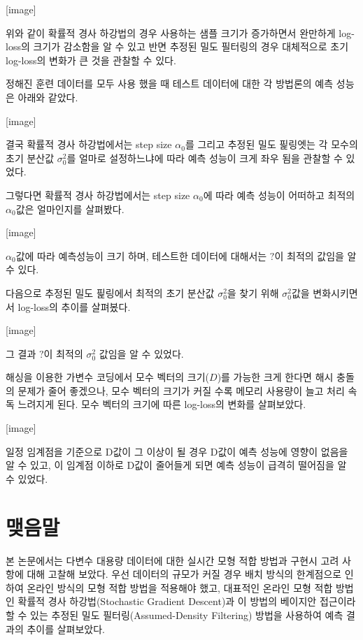 \documentclass[oneside,b5paper,11pt]{book} %
\begin{document}
[image]

위와 같이 확률적 경사 하강법의 경우 사용하는 샘플 크기가 증가하면서 완만하게 log-loss의 크기가 감소함을 알 수 있고 반면 추정된 밀도 필터링의 경우 대체적으로 초기 log-loss의 변화가 큰 것을 관찰할 수 있다. 

 정해진 훈련 데이터를 모두 사용 했을 때 테스트 데이터에 대한 각 방법론의 예측 성능은 아래와 같았다.

[image]

결국 확률적 경사 하강법에서는 step size $\alpha_0$를 그리고 추정된 밀도 핉링엣는 각 모수의 초기 분산값 $\sigma_0^2$를 얼마로 설정하느냐에 따라 예측 성능이 크게 좌우 됨을 관찰할 수 있었다.

 그렇다면 확률적 경사 하강법에서는 step size $\alpha_0$에 따라 예측 성능이 어떠하고 최적의 $\alpha_0$값은 얼마인지를 살펴봤다.

[image]

$\alpha_0$값에 따라 예측성능이 크기 하며, 테스트한 데이터에 대해서는 $?$이 최적의 값임을 알 수 있다.


다음으로 추정된 밀도 핉링에서 최적의 초기 분산값 $\sigma_0^2$을 찾기 위해 $\sigma_0^2$값을 변화시키면서 log-loss의 추이를 살펴봈다.

[image]

그 결과 $?$이 최적의 $\sigma_0^2$ 값임을 알 수 있었다.


 해싱을 이용한 가변수 코딩에서 모수 벡터의 크기($D$)를 가능한 크게 한다면 해시 충돌의 문제가 줄어 좋겠으나, 모수 벡터의 크기가 커질 수록 메모리 사용량이 늘고 처리 속독 느려지게 된다. 모수 벡터의 크기에 따른 log-loss의 변화를 살펴보았다.

[image]

일정 임계점을 기준으로 D값이 그 이상이 될 경우 D값이 예측 성능에 영향이 없음을 알 수 있고, 이 임계점 이하로 D값이 줄어들게 되면 예측 성능이 급격히 떨어짐을 알 수 있었다.






%
%
\chapter{맺음말}
 본 논문에서는 다변수 대용량 데이터에 대한 실시간 모형 적합 방법과 구현시 고려 사항에 대해 고찰해 보았다. 우선 데이터의 규모가 커질 경우 배치 방식의 한계점으로 인하여 온라인 방식의 모형 적합 방법을 적용해야 했고, 대표적인 온라인 모형 적합 방법인 확률적 경사 하강법(Stochastic Gradient Descent)과 이 방법의 베이지안 접근이라 할 수 있는 추정된 밀도 필터링(Assumed-Density Filtering) 방법을 사용하여 예측 결과의 추이를 살펴보았다. 
\end{document}
